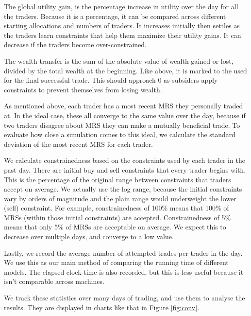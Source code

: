 \documentclass[12pt,a4paper,titlepage]{article}
\begin{document}
The global utility gain, is the percentage increase in utility over the day for all the traders. 
Because it is a percentage, it can be compared across different starting allocations and numbers of traders.
It increases initially then settles as the traders learn constraints that help them maximize their utility gains.
It can decrease if the traders become over-constrained.

The wealth transfer is the sum of the absolute value of wealth gained or lost, divided by the total wealth at the beginning.
Like above, it is marked to the used for the final successful trade.
This should approach 0 as subsiders apply constraints to prevent themselves from losing wealth.

As mentioned above, each trader has a most recent MRS they personally traded at.
In the ideal case, these all converge to the same value over the day, because if two traders disagree about MRS they can make a mutually beneficial trade.
To evaluate how close a simulation comes to this ideal, we calculate the standard deviation of the most recent MRS for each trader.

    
We calculate constrainedness based on the constraints used by each trader in the past day.
There are initial buy and sell constraints that every trader begins with.
This is the percentage of the original range between constraints that traders accept on average.
We actually use the log range, because the initial constraints vary by orders of magnitude and the plain range would underweight the lower (sell) constraint.
For example, constrainedness of 100\% means that 100\% of MRSs (within those initial constraints) are accepted.
Constrainedness of 5\% means that only 5\% of MRSs are acceptable on average.
We expect this to decrease over multiple days, and converge to a low value.

Lastly, we record the average number of attempted trades per trader in the day.
We use this as our main method of comparing the running time of different models.
The elapsed clock time is also recorded, but this is less useful because it isn't comparable across machines.

We track these statistics over many days of trading, and use them to analyse the results.
They are displayed in charts like that in Figure \ref{fig:conv}.
\end{document}

